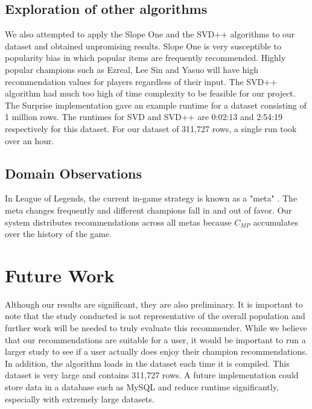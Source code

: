 \documentclass [11pt]{IEEEtran}
\begin{document}
\subsection{Exploration of other algorithms}
We also attempted to apply the Slope One \cite{lemire2005slope} and the SVD++ algorithms to our dataset and obtained unpromising results. Slope One is very susceptible to popularity bias in which popular items are frequently recommended. Highly popular champions such as Ezreal, Lee Sin and Yasuo will have high recommendation values for players regardless of their input. The SVD++ algorithm had much too high of time complexity to be feasible for our project. The Surprise implementation gave an example runtime for a dataset consisting of 1 million rows. The runtimes for SVD and SVD++ are 0:02:13 and 2:54:19 \cite{Surprise} respectively for this dataset. For our dataset of 311,727 rows, a single run took over an hour.
\subsection{Domain Observations}
In League of Legends, the current in-game strategy is known as a "meta" \cite{kou2014governance}. The meta changes frequently and different champions fall in and out of favor. Our system distributes recommendations across all metas because $C_{MP}$ accumulates over the history of the game. 
\section{Future Work}
Although our results are significant, they are also preliminary. It is important to note that the study conducted is not representative of the overall population and further work will be needed to truly evaluate this recommender. While we believe that our recommendations are suitable for a user, it would be important to run a larger study to see if a user actually does enjoy their champion recommendations. \\ \indent In addition, the algorithm loads in the dataset each time it is compiled. This dataset is very large and contains 311,727 rows. A future implementation could store data in a database such as MySQL and reduce runtime significantly, especially with extremely large datasets.
\nocite{*}


\end{document}
